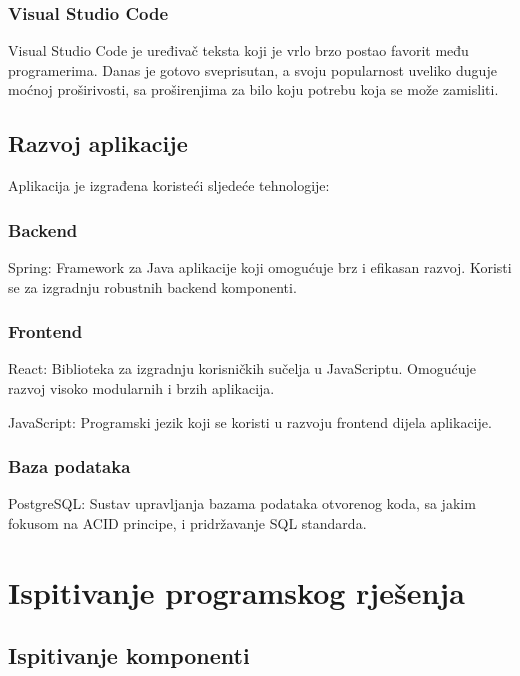 \subsubsection{Visual Studio Code}
Visual Studio Code je uređivač teksta koji je vrlo brzo postao favorit među
programerima. Danas je gotovo sveprisutan, a svoju popularnost uveliko
duguje moćnoj proširivosti, sa proširenjima za bilo koju potrebu koja se
može zamisliti.

\subsection{Razvoj aplikacije}

Aplikacija je izgrađena koristeći sljedeće tehnologije:

\subsubsection{Backend}

Spring: Framework za Java aplikacije koji omogućuje brz i efikasan razvoj. 
Koristi se za izgradnju robustnih backend komponenti.

\subsubsection{Frontend}

React: Biblioteka za izgradnju korisničkih sučelja u JavaScriptu. Omogućuje 
razvoj visoko modularnih i brzih aplikacija.

JavaScript: Programski jezik koji se koristi u razvoju frontend dijela 
aplikacije.

\subsubsection{Baza podataka}

PostgreSQL: Sustav upravljanja bazama podataka otvorenog koda, sa jakim 
fokusom na ACID principe, i pridržavanje SQL standarda.
			
			
			\eject 
		
	
		\section{Ispitivanje programskog rješenja}
		
		\subsection{Ispitivanje komponenti}

